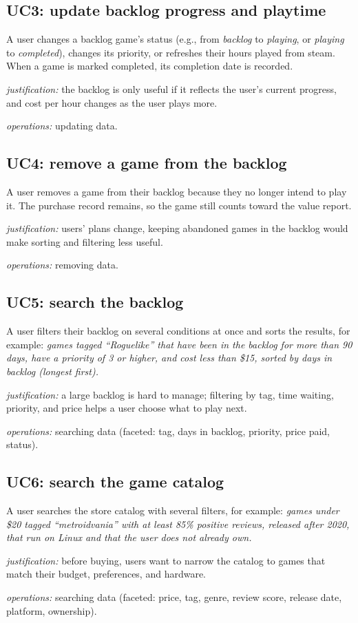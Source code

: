\documentclass[11pt]{article}
\newcommand{\ops}[1]{\par\smallskip\textit{operations:} #1}
\newcommand{\why}[1]{\par\textit{justification:} #1}
\begin{document}
\subsection{UC3: update backlog progress and playtime}
A user changes a backlog game's status (e.g., from \textit{backlog} to
\textit{playing}, or \textit{playing} to \textit{completed}), changes its priority,
or refreshes their hours played from steam. When a game is marked completed, its
completion date is recorded.
\why{the backlog is only useful if it reflects the user's current progress, and
cost per hour changes as the user plays more.}
\ops{updating data.}

\subsection{UC4: remove a game from the backlog}
A user removes a game from their backlog because they no longer intend to play it.
The purchase record remains, so the game still counts toward the value report.
\why{users' plans change, keeping abandoned games in the backlog would make sorting
and filtering less useful.}
\ops{removing data.}

\subsection{UC5: search the backlog}
A user filters their backlog on several conditions at once and sorts the results,
for example: \emph{games tagged ``Roguelike'' that have been in the backlog for more
than 90 days, have a priority of 3 or higher, and cost less than \$15, sorted by
days in backlog (longest first).}
\why{a large backlog is hard to manage; filtering by tag, time waiting, priority,
and price helps a user choose what to play next.}
\ops{searching data (faceted: tag, days in backlog, priority, price paid, status).}

\subsection{UC6: search the game catalog}
A user searches the store catalog with several filters, for example: \emph{games
under \$20 tagged ``metroidvania'' with at least 85\% positive reviews, released
after 2020, that run on Linux and that the user does not already own.}
\why{before buying, users want to narrow the catalog to games that match their
budget, preferences, and hardware.}
\ops{searching data (faceted: price, tag, genre, review score, release date,
platform, ownership).}
\end{document}
